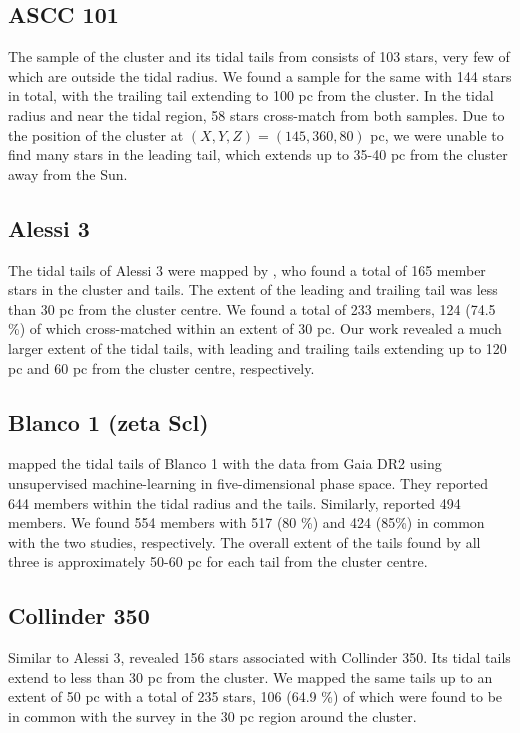 \documentclass{aa}
\begin{document}
\subsection{ASCC 101}
The sample of the cluster and its tidal tails from \citet{10.1093/mnras/stac2906} consists of 103 stars, very few of which are outside the tidal radius. We found a sample for the same with 144 stars in total, with the trailing tail extending to 100 pc from the cluster. In the tidal radius and near the tidal region, 58 stars cross-match from both samples. Due to the position of the cluster at $(X,Y,Z) = (145, 360, 80)$ pc, we were unable to find many stars in the leading tail, which extends up to 35-40 pc from the cluster away from the Sun.

\subsection{Alessi 3}
The tidal tails of Alessi 3 were mapped by \citet{2022ApJ...931..156Pang}, who found a total of 165 member stars in the cluster and tails. The extent of the leading and trailing tail was less than 30 pc from the cluster centre. We found a total of 233 members, 124 (74.5 \%) of which cross-matched within an extent of 30 pc. Our work revealed a much larger extent of the tidal tails, with leading and trailing tails extending up to 120 pc and 60 pc from the cluster centre, respectively. 


\subsection{Blanco 1 (zeta Scl)}
\citet{2020ApJ...889...99Zhang} mapped the tidal tails of Blanco 1 with the data from Gaia DR2 using unsupervised machine-learning in five-dimensional phase space. They reported 644 members within the tidal radius and the tails. Similarly, \citet{2021A&A...645A..84Meingast} reported 494 members. We found 554 members with 517 (80 \%) and 424 (85\%) in common with the two studies, respectively. The overall extent of the tails found by all three is approximately 50-60 pc for each tail from the cluster centre. 

\subsection{Collinder 350}
Similar to Alessi 3, \citet{2022ApJ...931..156Pang} revealed 156 stars associated with Collinder 350. Its tidal tails extend to less than 30 pc from the cluster. We mapped the same tails up to an extent of 50 pc with a total of 235 stars, 106 (64.9 \%) of which were found to be in common with the \citet{2022ApJ...931..156Pang} survey in the 30 pc region around the cluster. 
\end{document}
